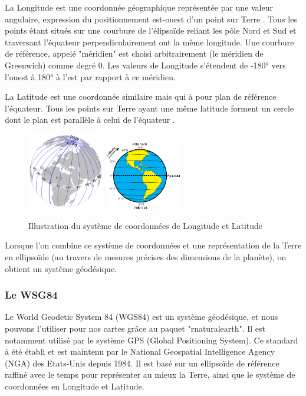 \documentclass{article}
\begin{document}
La Longitude est une coordonnée géographique représentée par une valeur angulaire, expression du positionnement est-ouest d'un point sur Terre \cite{frwiki:188614923}. Tous les points étant situés sur une courbure de l'élipsoïde reliant les pôle Nord et Sud et traversant l'équateur     perpendiculairement ont la même longitude. Une courbure de référence, appelé "méridien" est choisi arbitrairement (le méridien de Greenwich) comme degré 0. Les valeurs de Longitude s'étendent de -180° vers l'ouest à 180° à l'est par rapport à ce méridien. 

La Latitude est une coordonnée similaire mais qui à pour plan de référence l'équateur. Tous les points sur Terre ayant une même latitude forment un cercle dont le plan est parallèle à celui de l'équateur \cite{frwiki:189341688}. 

\begin{figure}[H]
    \centering
    \includegraphics[width=0.3\textwidth]{Images/Cartographie/Longitude.png}
    \includegraphics[width=0.3\textwidth]{Images/Cartographie/Latitude.png}
    \caption{Illustration du système de coordonnées de Longitude et Latitude}
\end{figure}

Lorsque l'on combine ce système de coordonnées et une représentation de la Terre en ellipsoïde (au travers de mesures précises des dimensions de la planète), on obtient un système géodésique.

\subsubsection{Le WSG84}

Le World Geodetic System 84 (WGS84) est un système géodésique, et nous pouvons l'utiliser pour nos cartes grâce au paquet "rnaturalearth". Il est notamment utilisé par le système GPS (Global Positioning System). Ce standard à été établi et est maintenu par le National Geospatial Intelligence Agency (NGA) des Etats-Unis \cite{enwiki:1065796786} depuis 1984. Il est basé sur un ellipsoïde de référence raffiné avec le temps pour représenter au mieux la Terre, ainsi que le système de coordonnées en Longitude et Latitude.
\end{document}
